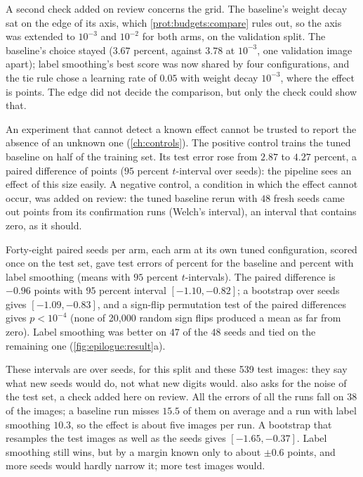 \begin{refsection}
A second check added on review concerns the grid. The baseline's weight decay sat on the edge of its axis, which \cref{prot:budgets:compare} rules out, so the axis was extended to $10^{-3}$ and $10^{-2}$ for both arms, on the validation split. The baseline's choice stayed ($3.67$ percent, against $3.78$ at $10^{-3}$, one validation image apart); label smoothing's best score was now shared by four configurations, and the tie rule chose a learning rate of $0.05$ with weight decay $10^{-3}$, where the effect is  points. The edge did not decide the comparison, but only the check could show that.


An experiment that cannot detect a known effect cannot be trusted to report the absence of an unknown one (\cref{ch:controls}). The positive control trains the tuned baseline on half of the training set. Its test error rose from $2.87$ to $4.27$ percent, a paired difference of  points ($95$ percent $t$-interval over seeds): the pipeline sees an effect of this size easily. A negative control, a condition in which the effect cannot occur, was added on review: the tuned baseline rerun with $48$ fresh seeds came out  points from its confirmation runs (Welch's interval), an interval that contains zero, as it should.


Forty-eight paired seeds per arm, each arm at its own tuned configuration, scored once on the test set, gave test errors of  percent for the baseline and  percent with label smoothing (means with $95$ percent $t$-intervals). The paired difference is $-0.96$ points with $95$ percent interval $[-1.10,-0.82]$; a bootstrap over seeds gives $[-1.09,-0.83]$, and a sign-flip permutation test of the paired differences gives $p<10^{-4}$ (none of 20{,}000 random sign flips produced a mean as far from zero). Label smoothing was better on $47$ of the $48$ seeds and tied on the remaining one (\cref{fig:epilogue:result}a).

These intervals are over seeds, for this split and these 539 test images: they say what new seeds would do, not what new digits would.  also asks for the noise of the test set, a check added here on review. All the errors of all the runs fall on 38 of the images; a baseline run misses $15.5$ of them on average and a run with label smoothing $10.3$, so the effect is about five images per run. A bootstrap that resamples the test images as well as the seeds \parencite{Owen2007} gives $[-1.65,-0.37]$. Label smoothing still wins, but by a margin known only to about $\pm0.6$ points, and more seeds would hardly narrow it; more test images would.


\end{refsection}
